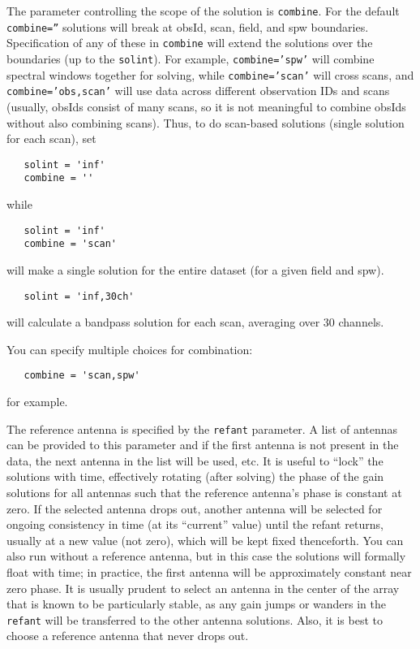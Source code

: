 The parameter controlling the scope of the solution is {\tt combine}.
For the default {\tt combine=''} solutions will break at obsId, scan,
field, and spw boundaries.  Specification of any of these in {\tt combine} will
extend the solutions over the boundaries (up to the {\tt solint}). 
For example, {\tt combine='spw'} will combine spectral windows
together for solving, while {\tt combine='scan'} will cross scans, and
{\tt combine='obs,scan'} will use data across different observation
IDs and scans (usually, obsIds consist of many scans, so it is
not meaningful to combine obsIds without also combining scans).  
Thus, to do scan-based solutions (single solution for each scan), set
\small
\begin{verbatim}
   solint = 'inf'
   combine = ''
\end{verbatim} 
\normalsize
while
\small
\begin{verbatim}
   solint = 'inf'
   combine = 'scan'
\end{verbatim} 
\normalsize
will make a single solution for the entire dataset (for a given field
and spw).  
\small
\begin{verbatim}
   solint = 'inf,30ch'
\end{verbatim}
will calculate a bandpass solution for each scan, averaging over 30
channels.

You can specify multiple choices for combination:
\small
\begin{verbatim}
   combine = 'scan,spw'
\end{verbatim} 
\normalsize
for example.

The reference antenna is specified by the {\tt refant} parameter. A
list of antennas can be provided to this parameter and if the first
antenna is not present in the data, the next antenna in the list will
be used, etc.  It is useful to ``lock'' the solutions with time,
effectively rotating (after solving) the phase of the gain solutions
for all antennas such that the reference antenna's phase is constant
at zero.  If the selected antenna drops out, another antenna will be
selected for ongoing consistency in time (at its ``current'' value)
until the refant returns, usually at a new value (not zero), which
will be kept fixed thenceforth.  You can also run without a reference
antenna, but in this case the solutions will formally float with time;
in practice, the first antenna will be approximately constant near
zero phase.  It is usually prudent to select an antenna in the center
of the array that is known to be particularly stable, as any gain
jumps or wanders in the {\tt refant} will be transferred to the other
antenna solutions.  Also, it is best to choose a reference antenna
that never drops out.



